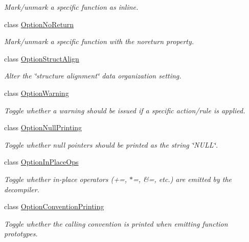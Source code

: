 \begin{DoxyCompactItemize}
\begin{DoxyCompactList}\small\item\em Mark/unmark a specific function as {\itshape inline}. \end{DoxyCompactList}\item 
class \mbox{\hyperlink{class_option_no_return}{Option\+No\+Return}}
\begin{DoxyCompactList}\small\item\em Mark/unmark a specific function with the {\itshape noreturn} property. \end{DoxyCompactList}\item 
class \mbox{\hyperlink{class_option_struct_align}{Option\+Struct\+Align}}
\begin{DoxyCompactList}\small\item\em Alter the \char`\"{}structure alignment\char`\"{} data organization setting. \end{DoxyCompactList}\item 
class \mbox{\hyperlink{class_option_warning}{Option\+Warning}}
\begin{DoxyCompactList}\small\item\em Toggle whether a warning should be issued if a specific action/rule is applied. \end{DoxyCompactList}\item 
class \mbox{\hyperlink{class_option_null_printing}{Option\+Null\+Printing}}
\begin{DoxyCompactList}\small\item\em Toggle whether null pointers should be printed as the string \char`\"{}\+N\+U\+L\+L\char`\"{}. \end{DoxyCompactList}\item 
class \mbox{\hyperlink{class_option_in_place_ops}{Option\+In\+Place\+Ops}}
\begin{DoxyCompactList}\small\item\em Toggle whether {\itshape in-\/place} operators (+=, $\ast$=, \&=, etc.) are emitted by the decompiler. \end{DoxyCompactList}\item 
class \mbox{\hyperlink{class_option_convention_printing}{Option\+Convention\+Printing}}
\begin{DoxyCompactList}\small\item\em Toggle whether the {\itshape calling} {\itshape convention} is printed when emitting function prototypes. \end{DoxyCompactList}\item 

\end{DoxyCompactItemize}
